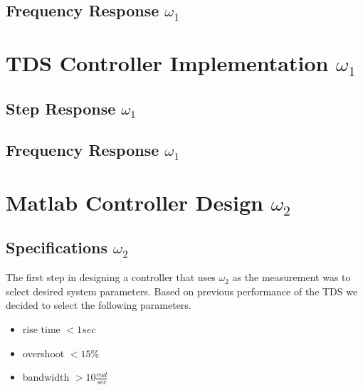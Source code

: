 \documentclass[11pt,titlepage]{article}
\begin{document}
	\subsection{Frequency Response $\omega_1$}

\section{TDS Controller Implementation $\omega_1$}

	\subsection{Step Response $\omega_1$}

	\subsection{Frequency Response $\omega_1$}

\section{Matlab Controller Design $\omega_2$}

	\subsection{Specifications $\omega_2$}
		The first step in designing a controller that uses $\omega_2$ as the measurement was to select desired system parameters. Based on previous performance of the TDS we decided to select the following parameters.
		\begin{itemize}
			\item rise time $< 1sec$
			\item overshoot $< 15\%$
			\item bandwidth $> 10 \frac{rad}{sec}$
		\end{itemize}
\end{document}
